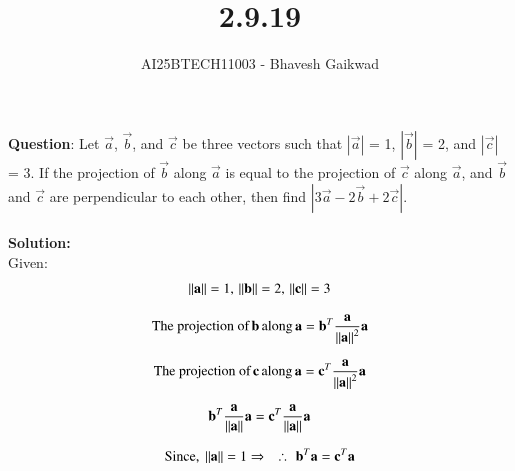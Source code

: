 \documentclass[journal]{IEEEtran}
\begin{document}

\vspace{3cm}

\title{2.9.19}
\author{AI25BTECH11003 - Bhavesh Gaikwad}
{\let\newpage\relax\maketitle}

\renewcommand{\thefigure}{\theenumi}
\renewcommand{\thetable}{\theenumi}
\setlength{\intextsep}{10pt} 


\renewcommand{\thetable}{\theenumi}


\textbf{Question}: Let $\overrightarrow{a}$,
$\overrightarrow{b}$, and $\overrightarrow{c}$ be three vectors such that $|\overrightarrow{a}|$ = 1, $|\overrightarrow{b}|$ = 2, and $|\overrightarrow{c}|$ = 3. If the
projection of $\overrightarrow{b}$ along $\overrightarrow{a}$ is equal to the projection of $\overrightarrow{c}$ along $\overrightarrow{a}$, and $\overrightarrow{b}$ and $\overrightarrow{c}$ are perpendicular to each other, then find $|3\overrightarrow{a} - 2\overrightarrow{b} + 2\overrightarrow{c}|$. \\\\


\textbf{Solution:}\\
Given: 
\begin{equation}
\left\lVert\mathbf{a}\right\rVert = 1, \, \left\lVert\mathbf{b}\right\rVert = 2, \, \left\lVert\mathbf{c}\right\rVert = 3\\
\end{equation}

\begin{equation}
\text{The projection of} \, \mathbf{b} \, \text{along} \, \mathbf{a} = \mathbf{b}^T\dfrac{\mathbf{a}}{\left\lVert\mathbf{a}\right\rVert^2}\mathbf{a}    
\end{equation}

\begin{equation}
\text{The projection of} \, \mathbf{c} \, \text{along} \, \mathbf{a} = \mathbf{c}^T\dfrac{\mathbf{a}}{\left\lVert\mathbf{a}\right\rVert^2}\mathbf{a}    
\end{equation}


\begin{equation}
\mathbf{b}^T\dfrac{\mathbf{a}}{\left\lVert\mathbf{a}\right\rVert}\mathbf{a} = \mathbf{c}^T\dfrac{\mathbf{a}}{\left\lVert\mathbf{a}\right\rVert}\mathbf{a}\\
\end{equation}

\begin{equation}
\text{Since, } \left\lVert\mathbf{a}\right\rVert = 1
\Rightarrow \quad
\therefore \, \, \mathbf{b}^T\mathbf{a} = \mathbf{c}^T\mathbf{a}
\end{equation}
\end{document}
